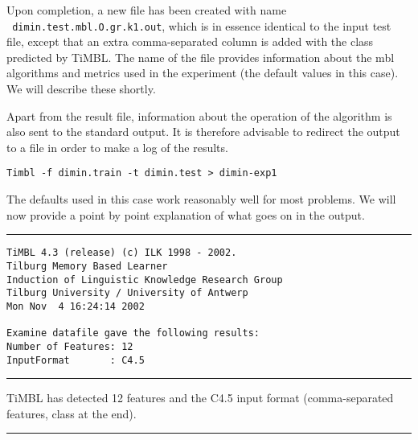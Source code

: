 \documentclass{report}
\begin{document}
Upon completion, a new file has been created with name\\ {\tt
dimin.test.mbl.O.gr.k1.out}, which is in essence identical to the
input test file, except that an extra comma-separated column is added
with the class predicted by TiMBL. The name of the file provides
information about the {\sc mbl} algorithms and metrics used in the
experiment (the default values in this case). We will describe these
shortly.

Apart from the result file, information about the operation of the
algorithm is also sent to the standard output. It is therefore 
advisable to redirect the output to a file in order to make a log of
the results.

{\small
\begin{verbatim}
Timbl -f dimin.train -t dimin.test > dimin-exp1
\end{verbatim}
}

The defaults used in this case work reasonably well for most problems.  We
will now provide a point by point explanation of what goes on in the
output.

\vspace{1cm}

\rule{\textwidth}{0.5mm}

{\small
\begin{verbatim}
TiMBL 4.3 (release) (c) ILK 1998 - 2002.
Tilburg Memory Based Learner
Induction of Linguistic Knowledge Research Group
Tilburg University / University of Antwerp
Mon Nov  4 16:24:14 2002
 
Examine datafile gave the following results:
Number of Features: 12
InputFormat       : C4.5
\end{verbatim}
}

\rule{\textwidth}{0.5mm}

\vspace{1cm}

TiMBL has detected 12 features and the C4.5 input format
(comma-separated features, class at the end).

\rule{\textwidth}{0.5mm}
\end{document}
